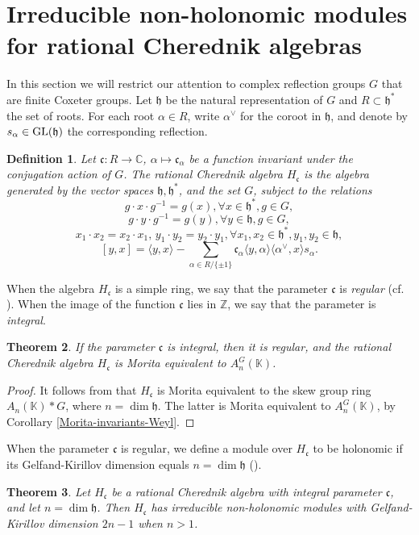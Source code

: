 \documentclass[12pt, a4paper]{amsart}
\newtheorem{theorem}{Theorem}[section]
\newtheorem{definition}[theorem]{Definition}
\newcommand{\Weyl}{A_n(\mathbb{K})} %
\newcommand{\Invar}{A_n^G(\mathbb{K})}           %
\def\C{\mathbb C}
\newcommand{\GL}{{\rm{GL}}}
\def\Z{\mathbb Z}
\def\h{\mathfrak h}
\def\c{\mathfrak c}
\begin{document}
\section{Irreducible non-holonomic modules for rational Cherednik algebras}
In this section we will restrict our attention to complex reflection groups $G$ that are finite Coxeter groups. Let $\h$ be the natural representation of $G$ and $R \subset \h^*$ the set of roots. For each root $\alpha \in R$, write $\alpha^\vee$ for the coroot in $\h$, and denote by $s_\alpha \in \GL(\h)$ the corresponding reflection.
\begin{definition}\cite{EG}
Let $\c: R \rightarrow \C$, $\alpha \mapsto \c_\alpha$ be a function invariant under the conjugation action of $G$. The \textit{rational Cherednik algebra} $H_\c$ is the algebra generated by the vector spaces $\h, \h^*$, and the set $G$, subject to the relations
\[ g \cdot x \cdot g^{-1} =g(x), \forall x \in \h^*, g \in G,\]
\[ g \cdot y \cdot g^{-1} = g(y), \forall y \in \h, g \in G,\]
\[ x_1 \cdot x_2 = x_2 \cdot x_1, \, y_1 \cdot y_2 = y_2 \cdot y_1 , \forall x_1,x_2 \in \h^*, y_1, y_2 \in \h, \]
\[ [y,x] = \langle y, x \rangle - \sum_{\alpha \in R / \{ \pm 1\}} \c_\alpha \langle y, \alpha \rangle \langle \alpha^\vee, x \rangle s_\alpha.\]
\end{definition}
When the algebra $H_\c$ is a simple ring, we say that the parameter $\c$ is \textit{regular} (cf. \cite[Theorem 3.2]{Thompson}). When the image of the function $\c$ lies in $\Z$, we say that the parameter is \textit{integral}.
\begin{theorem}\label{thm-Cherednik}
    If the parameter $\c$ is integral, then it is regular, and the rational Cherednik algebra $H_\c$ is Morita equivalent to $\Invar$.
\end{theorem}
\begin{proof}
    It follows from \cite[Theorem 3.1, Lemma 8.2]{Berest} that $H_\c$ is Morita equivalent to the skew group ring $\Weyl*G$, where $n=\dim \h$. The latter is Morita equivalent to $\Invar$, by Corollary \ref{Morita-invariants-Weyl}.
\end{proof}
When the parameter $\c$ is regular, we define a module over $H_\c$ to be holonomic if its Gelfand-Kirillov dimension equals $n=\dim \h$ (\cite[Proposition 3.7]{Thompson}).
\begin{theorem}\label{iredd-non-hol-Cherednik}
Let $H_\c$ be a rational Cherednik algebra with integral parameter $\c$, and let $n=\dim \h$. Then $H_\c$ has irreducible non-holonomic modules with Gelfand-Kirillov dimension $2n-1$ when $n>1$.
\end{theorem}
\end{document}
